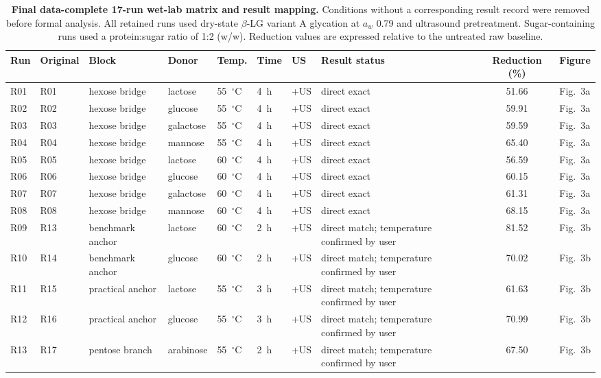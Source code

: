 \begin{table}[p]
\centering
\scriptsize
\caption{\textbf{Final data-complete 17-run wet-lab matrix and result mapping.} Conditions without a corresponding result record were removed before formal analysis. All retained runs used dry-state $\beta$-LG variant A glycation at $a_w$ 0.79 and ultrasound pretreatment. Sugar-containing runs used a protein:sugar ratio of 1:2 (w/w). Reduction values are expressed relative to the untreated raw baseline.}
\label{tab:formal_run_mapping}
\begin{tabular}{@{}llllllllcl@{}}
\toprule
Run & Original & Block & Donor & Temp. & Time & US & Result status & Reduction (\%) & Figure \\
\midrule
R01 & R01 & hexose bridge & lactose & 55~$^\circ$C & 4~h & +US & direct exact & 51.66 & Fig.~3a \\
R02 & R02 & hexose bridge & glucose & 55~$^\circ$C & 4~h & +US & direct exact & 59.91 & Fig.~3a \\
R03 & R03 & hexose bridge & galactose & 55~$^\circ$C & 4~h & +US & direct exact & 59.59 & Fig.~3a \\
R04 & R04 & hexose bridge & mannose & 55~$^\circ$C & 4~h & +US & direct exact & 65.40 & Fig.~3a \\
R05 & R05 & hexose bridge & lactose & 60~$^\circ$C & 4~h & +US & direct exact & 56.59 & Fig.~3a \\
R06 & R06 & hexose bridge & glucose & 60~$^\circ$C & 4~h & +US & direct exact & 60.15 & Fig.~3a \\
R07 & R07 & hexose bridge & galactose & 60~$^\circ$C & 4~h & +US & direct exact & 61.31 & Fig.~3a \\
R08 & R08 & hexose bridge & mannose & 60~$^\circ$C & 4~h & +US & direct exact & 68.15 & Fig.~3a \\
R09 & R13 & benchmark anchor & lactose & 60~$^\circ$C & 2~h & +US & direct match; temperature confirmed by user & 81.52 & Fig.~3b \\
R10 & R14 & benchmark anchor & glucose & 60~$^\circ$C & 2~h & +US & direct match; temperature confirmed by user & 70.02 & Fig.~3b \\
R11 & R15 & practical anchor & lactose & 55~$^\circ$C & 3~h & +US & direct match; temperature confirmed by user & 61.63 & Fig.~3b \\
R12 & R16 & practical anchor & glucose & 55~$^\circ$C & 3~h & +US & direct match; temperature confirmed by user & 70.99 & Fig.~3b \\
R13 & R17 & pentose branch & arabinose & 55~$^\circ$C & 2~h & +US & direct match; temperature confirmed by user & 67.50 & Fig.~3b \\

\end{tabular}
\end{table}
